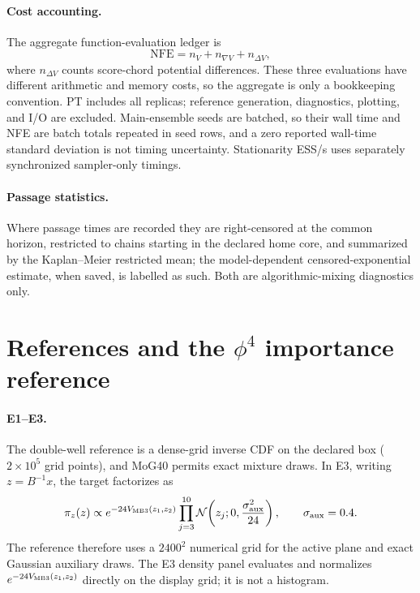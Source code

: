 \documentclass[11pt]{article}
\begin{document}
\paragraph{Cost accounting.}
The aggregate function-evaluation ledger is
\begin{equation}
 \mathrm{NFE}=n_V+n_{\nabla V}+n_{\Delta V},
\end{equation}
where $n_{\Delta V}$ counts score-chord potential differences.  These three
evaluations have different arithmetic and memory costs, so the aggregate is
only a bookkeeping convention.  PT includes all replicas; reference
generation, diagnostics, plotting, and I/O are excluded.  Main-ensemble seeds
are batched, so their wall time and NFE are batch totals repeated in seed rows,
and a zero reported wall-time standard deviation is not timing uncertainty.
Stationarity ESS/s uses separately synchronized sampler-only timings.

\paragraph{Passage statistics.}  Where passage times are recorded they are
right-censored at the common horizon, restricted to chains starting in the
declared home core, and summarized by the Kaplan--Meier restricted mean; the
model-dependent censored-exponential estimate, when saved, is labelled as
such.  Both are algorithmic-mixing diagnostics only.

\section{References and the
\texorpdfstring{$\phi^4$}{phi4} importance reference}
\label{app:references}

\paragraph{E1--E3.}
The double-well reference is a dense-grid inverse CDF on the declared box
($2\times10^5$ grid points), and MoG40 permits exact mixture draws.  In E3,
writing $z=B^{-1}x$, the target factorizes as
\begin{equation}
 \pi_z(z)\propto e^{-24V_{\rm MB3}(z_1,z_2)}
 \prod_{j=3}^{10}
 \mathcal N\!\left(z_j;0,\frac{\sigma_{\rm aux}^2}{24}\right),
 \qquad \sigma_{\rm aux}=0.4 .
\end{equation}
The reference therefore uses a $2400^2$ numerical grid for the active plane
and exact Gaussian auxiliary draws.  The E3 density panel evaluates and
normalizes $e^{-24V_{\rm MB3}(z_1,z_2)}$ directly on the display grid; it is
not a histogram.
\end{document}
